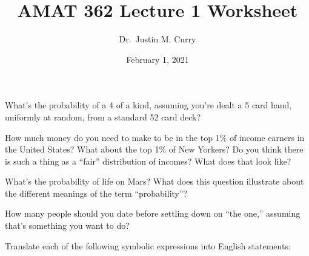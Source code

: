 \documentclass[addpoints,12pt]{exam}
\title{\vspace{-1in} AMAT 362 Lecture 1 Worksheet}
\date{February 1, 2021}
\author{Dr.~Justin M. Curry}
\begin{document}
\maketitle


\begin{questions}

\question[2] What's the probability of a 4 of a kind, assuming you're dealt a 5 card hand, uniformly at random, from a standard 52 card deck?


\question[1] How much money do you need to make to be in the top 1\% of income earners in the United States? What about the top 1\% of New Yorkers? Do you think there is such a thing as a ``fair'' distribution of incomes? What does that look like?


\question[1] What's the probability of life on Mars? What does this question illustrate about the different meanings of the term ``probability''?

%
\question[1] How many people should you date before settling down on ``the one,'' assuming that's something you want to do?


\question[6] Translate each of the following symbolic expressions into English statements:

\noaddpoints
{}
\end{questions}
\end{document}
